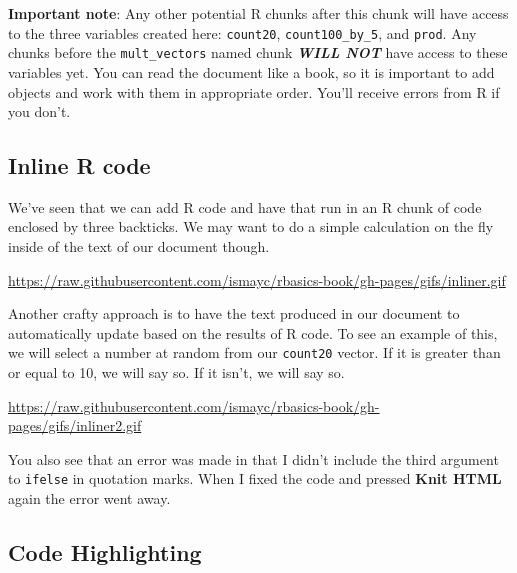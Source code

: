\documentclass[]{tufte-book}
\theoremstyle{definition}
\theoremstyle{definition}
\theoremstyle{remark}
\begin{document}
\textbf{Important note}: Any other potential R chunks after this chunk
will have access to the three variables created here: \texttt{count20},
\texttt{count100\_by\_5}, and \texttt{prod}. Any chunks before the
\texttt{mult\_vectors} named chunk \textbf{\emph{WILL NOT}} have access
to these variables yet. You can read the document like a book, so it is
important to add objects and work with them in appropriate order. You'll
receive errors from R if you don't.

\subsection{Inline R code}\label{inline-r-code}

We've seen that we can add R code and have that run in an R chunk of
code enclosed by three backticks. We may want to do a simple calculation
on the fly inside of the text of our document though.

\vspace{0.1in}

\begin{center}\footnotesize{\url{https://raw.githubusercontent.com/ismayc/rbasics-book/gh-pages/gifs/inliner.gif}}\end{center}

\vspace{0.1in}

Another crafty approach is to have the text produced in our document to
automatically update based on the results of R code. To see an example
of this, we will select a number at random from our \texttt{count20}
vector. If it is greater than or equal to 10, we will say so. If it
isn't, we will say so.

\vspace{0.1in}

\begin{center}\footnotesize{\url{https://raw.githubusercontent.com/ismayc/rbasics-book/gh-pages/gifs/inliner2.gif}}\end{center}

\vspace{0.1in}

You also see that an error was made in that I didn't include the third
argument to \texttt{ifelse} in quotation marks. When I fixed the code
and pressed \textbf{Knit HTML} again the error went away.

\subsection{Code Highlighting}\label{code-highlighting}
\end{document}
